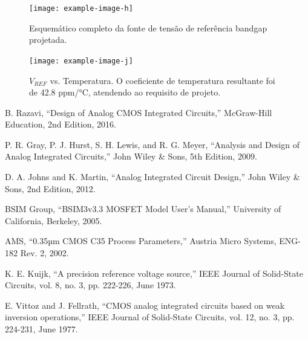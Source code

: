 ﻿\documentclass[12pt,a4paper]{article}
\begin{document}
\begin{figure}[H]
\centering
\texttt{[image: example-image-h]}
\caption{Esquemático completo da fonte de tensão de referência bandgap projetada.}
\label{fig:bandgap_complete_schematic}
\end{figure}

\begin{figure}[H]
\centering
\texttt{[image: example-image-j]}
\caption{$V_{REF}$ vs. Temperatura. O coeficiente de temperatura resultante foi de 42.8 ppm/°C, atendendo ao requisito de projeto.}
\label{fig:vref_vs_temp}
\end{figure}


{}
\begin{thebibliography}{99}
     B. Razavi, ``Design of Analog CMOS Integrated Circuits,'' McGraw-Hill Education, 2nd Edition, 2016.
    
     P. R. Gray, P. J. Hurst, S. H. Lewis, and R. G. Meyer, ``Analysis and Design of Analog Integrated Circuits,'' John Wiley \& Sons, 5th Edition, 2009.
    
     D. A. Johns and K. Martin, ``Analog Integrated Circuit Design,'' John Wiley \& Sons, 2nd Edition, 2012.
    
     BSIM Group, ``BSIM3v3.3 MOSFET Model User's Manual,'' University of California, Berkeley, 2005.
    
     AMS, ``0.35µm CMOS C35 Process Parameters,'' Austria Micro Systems, ENG-182 Rev. 2, 2002.
    
     K. E. Kuijk, ``A precision reference voltage source,'' IEEE Journal of Solid-State Circuits, vol. 8, no. 3, pp. 222-226, June 1973.
    
     E. Vittoz and J. Fellrath, ``CMOS analog integrated circuits based on weak inversion operations,'' IEEE Journal of Solid-State Circuits, vol. 12, no. 3, pp. 224-231, June 1977.
\end{thebibliography}
\end{document}
